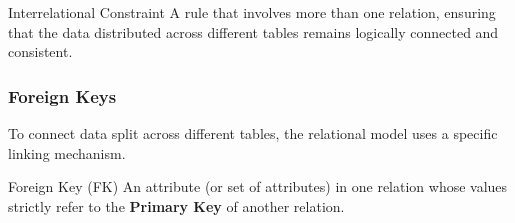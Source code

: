 \begin{defbox}{Interrelational Constraint}
A rule that involves more than one relation, ensuring that the data distributed across different tables remains logically connected and consistent.
\end{defbox}

\subsubsection{Foreign Keys}
To connect data split across different tables, the relational model uses a specific linking mechanism.

\begin{defbox}{Foreign Key (FK)}
An attribute (or set of attributes) in one relation whose values strictly refer to the \textbf{Primary Key} of another relation.
\end{defbox}

